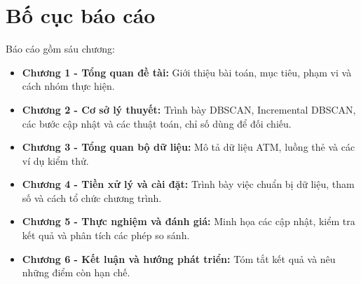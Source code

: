 \section{Bố cục báo cáo}

Báo cáo gồm sáu chương:

\begin{itemize}
    \item \textbf{Chương 1 - Tổng quan đề tài:} Giới thiệu bài toán, mục tiêu, phạm vi và cách nhóm thực hiện.
    \item \textbf{Chương 2 - Cơ sở lý thuyết:} Trình bày DBSCAN, Incremental DBSCAN, các bước cập nhật và các thuật toán, chỉ số dùng để đối chiếu.
    \item \textbf{Chương 3 - Tổng quan bộ dữ liệu:} Mô tả dữ liệu ATM, luồng thẻ và các ví dụ kiểm thử.
    \item \textbf{Chương 4 - Tiền xử lý và cài đặt:} Trình bày việc chuẩn bị dữ liệu, tham số và cách tổ chức chương trình.
    \item \textbf{Chương 5 - Thực nghiệm và đánh giá:} Minh họa các cập nhật, kiểm tra kết quả và phân tích các phép so sánh.
    \item \textbf{Chương 6 - Kết luận và hướng phát triển:} Tóm tắt kết quả và nêu những điểm còn hạn chế.
\end{itemize}
